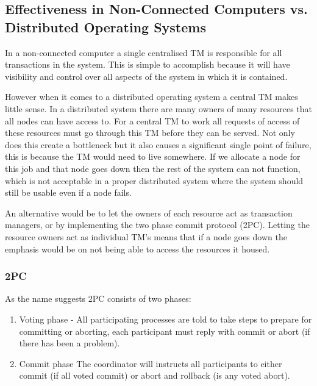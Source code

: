 \documentclass[a4paper,12pt]{article}
\begin{document}
\subsection*{Effectiveness in Non-Connected Computers vs. Distributed Operating Systems}
In a non-connected computer a single centralised TM is responsible for all transactions in the system. 
This is simple to accomplish because it will have visibility and control over all aspects of the system in which it is contained. 

However when it comes to a distributed operating system a central TM makes little sense. 
In a distributed system there are many owners of many resources that all nodes can have access to.
For a central TM to work all requests of access of these resources must go through this TM before they can be served.
Not only does this create a bottleneck but it also causes a significant single point of failure, this is because the TM would need to live somewhere. 
If we allocate a node for this job and that node goes down then the rest of the system can not function, which is not acceptable in a proper distributed system where the system should still be usable even if a node fails.


An alternative would be to let the owners of each resource act as transaction managers, or by implementing the two phase commit protocol (2PC).
Letting the resource owners act as individual TM's means that if a node goes down the emphasis would be on not being able to access the resources it housed.

\subsubsection*{2PC}
As the name suggests 2PC consists of two phases:
\begin{enumerate}
    \item{Voting phase - All participating processes are told to take steps to prepare for committing or aborting, each participant must reply with commit or abort (if there has been a problem).}
    \item{Commit phase  The coordinator will instructs all participants to either commit (if all voted commit) or abort and rollback (is any voted abort).}
\end{enumerate}






\vskip 0.2in
\newpage


\end{document}
